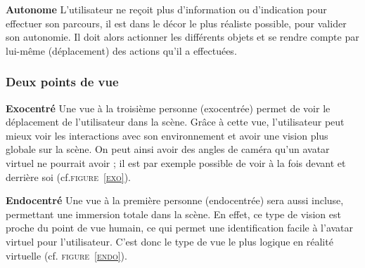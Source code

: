 \textbf{Autonome}
\newline
L'utilisateur ne reçoit plus d'information ou d'indication pour effectuer son parcours, il est dans le décor le plus réaliste possible, pour valider son autonomie. Il doit alors actionner les différents objets et se rendre compte par lui-même (déplacement) des actions qu'il a effectuées.

\subsubsection{Deux points de vue}

\textbf{Exocentré}
\newline
Une vue à la troisième personne (exocentrée) permet de voir le déplacement de l'utilisateur dans la scène. Grâce à cette vue, l'utilisateur peut mieux voir les interactions avec son environnement et avoir une vision plus globale sur la scène. On peut ainsi avoir des angles de caméra qu'un avatar virtuel ne pourrait avoir ; il est par exemple possible de voir à la fois devant et derrière soi (cf.\textsc{figure~\ref{exo}}).

\textbf{Endocentré}
\newline
Une vue à la première personne (endocentrée) sera aussi incluse, permettant une immersion totale dans la scène. En effet, ce type de vision est proche du point de vue humain, ce qui permet une identification facile à l'avatar virtuel pour l'utilisateur. C'est donc le type de vue le plus logique en réalité virtuelle (cf. \textsc{figure~\ref{endo}}).


